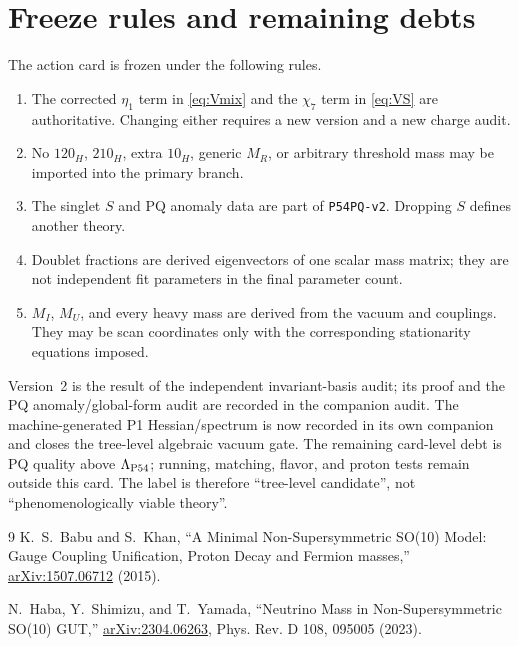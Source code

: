 \documentclass[11pt]{article}
\begin{document}
\section{Freeze rules and remaining debts}

The action card is frozen under the following rules.
\begin{enumerate}
\item The corrected $\eta_1$ term in \eqref{eq:Vmix} and the $\chi_7$ term
in \eqref{eq:VS} are authoritative.  Changing either requires a new version
and a new charge audit.
\item No $120_H$, $210_H$, extra $10_H$, generic $M_R$, or arbitrary
threshold mass may be imported into the primary branch.
\item The singlet $S$ and PQ anomaly data are part of \texttt{P54PQ-v2}.
Dropping $S$ defines another theory.
\item Doublet fractions are derived eigenvectors of one scalar mass matrix;
they are not independent fit parameters in the final parameter count.
\item $M_I$, $M_U$, and every heavy mass are derived from the vacuum and
couplings.  They may be scan coordinates only with the corresponding
stationarity equations imposed.
\end{enumerate}

Version~2 is the result of the independent invariant-basis audit; its proof
and the PQ anomaly/global-form audit are recorded in the companion audit.
The machine-generated P1 Hessian/spectrum is now recorded in its own
companion and closes the tree-level algebraic vacuum gate.  The remaining
card-level debt is PQ quality above $\Lambda_{\rm P54}$; running, matching,
flavor, and proton tests remain outside this card.  The label is therefore
``tree-level candidate'', not ``phenomenologically viable theory''.

\begin{thebibliography}{9}
K.~S.~Babu and S.~Khan,
``A Minimal Non-Supersymmetric SO(10) Model: Gauge Coupling Unification,
Proton Decay and Fermion masses,''
\href{https://arxiv.org/abs/1507.06712}{arXiv:1507.06712} (2015).

N.~Haba, Y.~Shimizu, and T.~Yamada,
``Neutrino Mass in Non-Supersymmetric SO(10) GUT,''
\href{https://arxiv.org/abs/2304.06263}{arXiv:2304.06263},
Phys. Rev. D 108, 095005 (2023).
\end{thebibliography}
\end{document}
